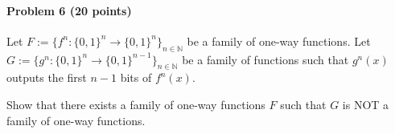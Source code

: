 \paragraph{Problem 6 (20 points)}
Let $F:= \{ f^n: \{0, 1\}^n \rightarrow \{0, 1\}^{n} \}_{n\in\mathbb{N}}$ be a family of one-way functions. 
Let $G:= \{ g^n: \{0, 1\}^n \rightarrow \{0, 1\}^{n-1} \}_{n\in\mathbb{N}}$ be a family of functions such that $g^n(x)$ outputs the first $n-1$ bits of $f^n(x)$. 

Show that there exists a family of one-way functions $F$ such that $G$ is NOT a family of one-way functions.

